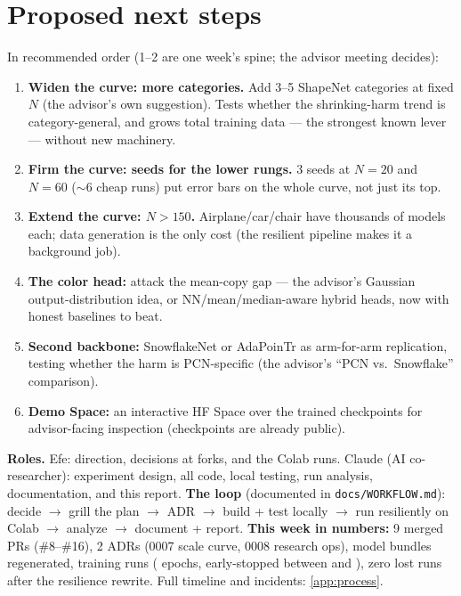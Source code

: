 \documentclass[11pt]{article}
\begin{document}
\section{Proposed next steps}\label{sec:next}

In recommended order (1--2 are one week's spine; the advisor meeting decides):

\begin{enumerate}
  \item \textbf{Widen the curve: more categories.} Add 3--5 ShapeNet categories at fixed
  $N$ (the advisor's own suggestion). Tests whether the shrinking-harm trend is
  category-general, and grows total training data --- the strongest known lever ---
  without new machinery.
  \item \textbf{Firm the curve: seeds for the lower rungs.} 3 seeds at $N{=}20$ and
  $N{=}60$ ($\sim$6 cheap runs) put error bars on the whole curve, not just its top.
  \item \textbf{Extend the curve: $N > 150$.} Airplane/car/chair have thousands of models
  each; data generation is the only cost (the resilient pipeline makes it a
  background job).
  \item \textbf{The color head:} attack the mean-copy gap --- the advisor's Gaussian
  output-distribution idea, or NN/mean/median-aware hybrid heads, now with honest
  baselines to beat.
  \item \textbf{Second backbone:} SnowflakeNet or AdaPoinTr as arm-for-arm replication,
  testing whether the harm is PCN-specific (the advisor's ``PCN vs.\ Snowflake''
  comparison).
  \item \textbf{Demo Space:} an interactive HF Space over the trained checkpoints for
  advisor-facing inspection (checkpoints are already public).
\end{enumerate}

\begin{processbox}
\textbf{Roles.} Efe: direction, decisions at forks, and the Colab runs. Claude (AI
co-researcher): experiment design, all code, local testing, run analysis, documentation,
and this report. \textbf{The loop} (documented in \texttt{docs/WORKFLOW.md}): decide
$\rightarrow$ grill the plan $\rightarrow$ ADR $\rightarrow$ build + test locally
$\rightarrow$ run resiliently on Colab $\rightarrow$ analyze $\rightarrow$ document +
report. \textbf{This week in numbers:} 9 merged PRs (\#8--\#16), 2 ADRs (0007 scale
curve, 0008 research ops), \nBundles{} model bundles regenerated, \nRuns{} training runs
(\totalEpochs{} epochs, early-stopped between \epochsMin{} and \epochsMax{}), zero lost
runs after the resilience rewrite. Full timeline and incidents: \cref{app:process}.
\end{processbox}
\end{document}
